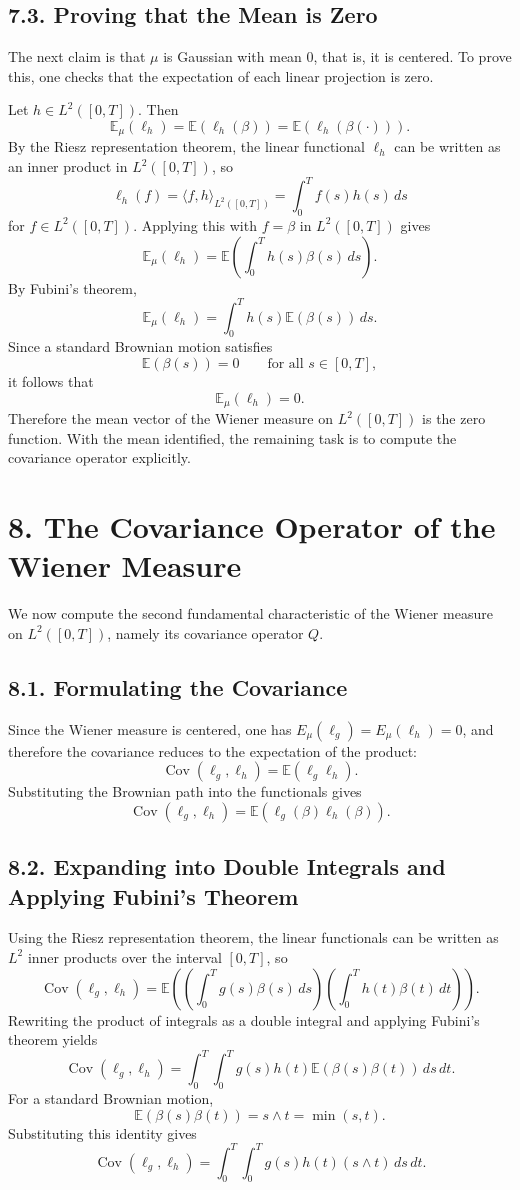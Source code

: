 \documentclass[11pt]{article}
\theoremstyle{definition}
\theoremstyle{remark}
\begin{document}
\subsection*{7.3. Proving that the Mean is Zero}
The next claim is that $\mu$ is Gaussian with mean $0$, that is, it is centered. To prove this, one checks that the expectation of each linear projection is zero.

Let $h\in L^2([0,T])$. Then
\[
\mathbb E_{\mu}(\ell_h)
=
\mathbb E(\ell_h(\beta))
=
\mathbb E(\ell_h(\beta(\cdot))).
\]
By the Riesz representation theorem, the linear functional $\ell_h$ can be written as an inner product in $L^2([0,T])$, so
\[
\ell_h(f)=\langle f,h\rangle_{L^2([0,T])}=\int_0^T f(s)h(s)\,ds
\]
for $f\in L^2([0,T])$. Applying this with $f=\beta$ in $L^2([0,T])$ gives
\[
\mathbb E_{\mu}(\ell_h)
=
\mathbb E\left(\int_0^T h(s)\beta(s)\,ds\right).
\]
By Fubini's theorem,
\[
\mathbb E_{\mu}(\ell_h)
=
\int_0^T h(s)\mathbb E(\beta(s))\,ds.
\]
Since a standard Brownian motion satisfies
\[
\mathbb E(\beta(s))=0
\qquad \text{for all } s\in[0,T],
\]
it follows that
\[
\mathbb E_{\mu}(\ell_h)=0.
\]
Therefore the mean vector of the Wiener measure on $L^2([0,T])$ is the zero function.
With the mean identified, the remaining task is to compute the covariance operator explicitly.

\section*{8. The Covariance Operator of the Wiener Measure}
We now compute the second fundamental characteristic of the Wiener measure on $L^2([0,T])$, namely its covariance operator $Q$.

\subsection*{8.1. Formulating the Covariance}
Since the Wiener measure is centered, one has $E_\mu(\ell_g)=E_\mu(\ell_h)=0$, and therefore the covariance reduces to the expectation of the product:
\[
\operatorname{Cov}(\ell_g,\ell_h)=\mathbb E(\ell_g\ell_h).
\]
Substituting the Brownian path into the functionals gives
\[
\operatorname{Cov}(\ell_g,\ell_h)=\mathbb E(\ell_g(\beta)\ell_h(\beta)).
\]

\subsection*{8.2. Expanding into Double Integrals and Applying Fubini's Theorem}
Using the Riesz representation theorem, the linear functionals can be written as $L^2$ inner products over the interval $[0,T]$, so
\[
\operatorname{Cov}(\ell_g,\ell_h)
=
\mathbb E\left(\left(\int_0^T g(s)\beta(s)\,ds\right)\left(\int_0^T h(t)\beta(t)\,dt\right)\right).
\]
Rewriting the product of integrals as a double integral and applying Fubini's theorem yields
\[
\operatorname{Cov}(\ell_g,\ell_h)
=
\int_0^T\int_0^T g(s)h(t)\mathbb E(\beta(s)\beta(t))\,ds\,dt.
\]
For a standard Brownian motion,
\[
\mathbb E(\beta(s)\beta(t))=s\wedge t=\min(s,t).
\]
Substituting this identity gives
\[
\operatorname{Cov}(\ell_g,\ell_h)
=
\int_0^T\int_0^T g(s)h(t)(s\wedge t)\,ds\,dt.
\]
\end{document}
